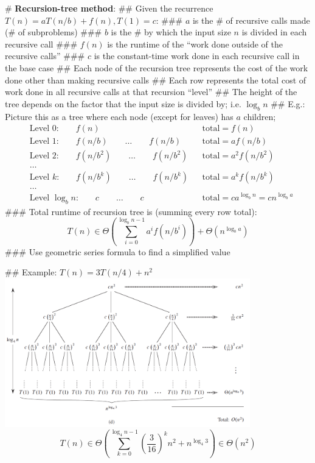 \documentclass[11pt, oneside]{article}
\begin{document}
# \textbf{Recursion-tree method}:
## Given the recurrence $T(n) = aT(n/b) + f(n), T(1) = c$:
### $a$ is the \# of recursive calls made (\# of subproblems) 
### $b$ is the \# by which the input size $n$ is divided in each recursive call
### $f(n)$ is the runtime of the ``work done outside of the recursive calls''
### $c$ is the constant-time work done in each recursive call in the base case
## Each node of the recursion tree represents the cost of the work done other than making recursive calls
## Each row represents the total cost of work done in all recursive calls at that recursion ``level'' 
## The height of the tree depends on the factor that the input size is divided by; i.e. $\log_b n$
## E.g.: Picture this as a tree where each node (except for leaves) has $a$ children;
\begin{align*}
&\text{Level 0:} \qquad f(n) &&\text{total} = f(n)\\
&\text{Level 1:} \qquad f(n/b) \qquad \ldots \qquad f(n/b) &&\text{total} = af(n/b) \\
&\text{Level 2:} \qquad f(n/b^2) \qquad \ldots \qquad f(n/b^2) &&\text{total} = a^2f(n/b^2) \\
&\ldots \\
&\text{Level $k$:} \qquad f(n/b^k) \qquad \ldots \qquad f(n/b^k) &&\text{total} = a^kf(n/b^k) \\
&\ldots \\
&\text{Level $\log_b n$:} \qquad c \qquad \ldots \qquad c &&\text{total} = ca^{\log_b n} = cn^{\log_b a}
\end{align*}
### Total runtime of recursion tree is (summing every row total):
$$T(n) \in \Theta\left(\sum_{i=0}^{\log_b n - 1} a^if(n/b^i)\right) + \Theta(n^{\log_b a})$$
### Use geometric series formula to find a simplified value

\newpage
## Example: $T(n) = 3T(n/4) + n^2$ \\
\includegraphics[width=0.8\textwidth]{rec_tree.png}
$$T(n) \in \Theta\left(\sum_{k=0}^{\log_4 n - 1} \left(\frac{3}{16}\right)^k n^2 + n^{\log_4 3}\right) \in \Theta(n^2)$$
\end{document}
